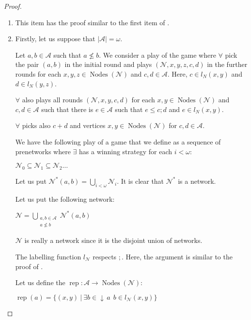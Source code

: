 \documentclass[a4paper]{article}
\theoremstyle{definition}
\theoremstyle{theorem}
\theoremstyle{proposition}
\theoremstyle{lemma}
\theoremstyle{ex}
\theoremstyle{corollary}
\theoremstyle{claim}
\newcommand{\down}[1]{\ensuremath{{\downarrow}\,#1}}
\begin{document}
\begin{proof}
$ $

  \begin{enumerate}
    \item This item has the proof similar to the first item of \cite[Proposition 5]{hirsch2005class}.

    \item
    Firstly, let us suppose that $|\mathcal{A}| = \omega$.

    Let $a, b \in \mathcal{A}$ such that $a \not\leq b$. We consider a play of the game where $\forall$ pick the pair $(a, b)$ in the initial round and plays $(\mathcal{N}, x, y, z, c, d)$ in the further rounds for each $x, y, z \in \operatorname{Nodes}(\mathcal{N})$ and $c,d \in \mathcal{A}$. Here, $c \in l_N(x, y)$ and $d \in l_N(y, z)$.

    $\forall$ also plays all rounds $(\mathcal{N},x,y,c,d)$ for each $x, y \in \operatorname{Nodes}(\mathcal{N})$ and $c,d \in \mathcal{A}$ such that there is $e \in \mathcal{A}$ such that
    $e \leq c ; d$ and $e \in l_N(x,y)$.

    $\forall$ picks also $c + d$ and vertices $x,y \in \operatorname{Nodes}(\mathcal{N})$ for $c, d \in \mathcal{A}$.

    We have the following play of a game that we define as a sequence of prenetworks where $\exists$ has a winning strategy for each $i < \omega$:

    \begin{center}
      $\mathcal{N}_0 \subseteq \mathcal{N}_1 \subseteq \mathcal{N}_2 \dots$
    \end{center}

    Let us put $\mathcal{N}^{*}(a, b) = \bigcup \limits_{i < \omega} \mathcal{N}_i$. It is clear that $\mathcal{N}^{*}$ is a network.

    Let us put the following network:

    \begin{center}
      $\mathcal{N} = \bigcup \limits_{\substack{a, b \in \mathcal{A} \\ a \not\leq b}} \mathcal{N}^{*}(a,b)$
    \end{center}

    $\mathcal{N}$ is really a network since it is the disjoint union of networks.

    The labelling function $l_{\mathcal{N}}$ respects $;$. Here, the argument is similar to the proof of \cite[Proposition 5]{hirsch2005class}.

    Let us define the $\operatorname{rep} : \mathcal{A} \to \operatorname{Nodes}(\mathcal{N})$:
    \begin{center}
      $\operatorname{rep}(a) = \{ (x, y) \: | \: \exists b \in \down{a} \:\: b \in l_{\mathcal{N}}(x, y)\}$
    \end{center}


\end{enumerate}
\end{proof}
\end{document}
